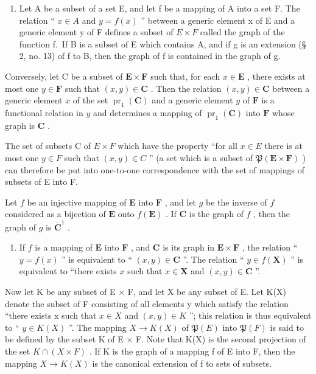 \begin{enumerate}
\def\labelenumi{\arabic{enumi}.}
\setcounter{enumi}{4}
\tightlist
\item
  Let A be a subset of a set E, and let f be a mapping of A into a set F. The relation `` \(x \in A\) and \(y = f(x)\) '' between a generic element x of E and a generic element y of F defines a subset of \(E \times F\) called the graph of the function f.~If B is a subset of E which contains A, and if g is an extension (§ 2, no. 13) of f to B, then the graph of f is contained in the graph of g.
\end{enumerate}

Conversely, let C be a subset of \(\mathbf{E} \times \mathbf{F}\) such that, for each \(x \in \mathbf{E}\) , there exists at most one \(y \in \mathbf{F}\) such that \((x, y) \in \mathbf{C}\) . Then the relation \((x, y) \in \mathbf{C}\) between a generic element \(x\) of the set \(\operatorname{pr}_1(\mathbf{C})\) and a generic element \(y\) of \(\mathbf{F}\) is a functional relation in \(y\) and determines a mapping of \(\operatorname{pr}_1(\mathbf{C})\) into \(\mathbf{F}\) whose graph is \(\mathbf{C}\) .

The set of subsets C of \(E \times F\) which have the property ``for all \(x \in E\) there is at most one \(y \in F\) such that \((x, y) \in C\) '' (a set which is a subset of \(\mathfrak{P}(\mathbf{E} \times \mathbf{F})\) ) can therefore be put into one-to-one correspondence with the set of mappings of subsets of E into F.

Let \(f\) be an injective mapping of \(\mathbf{E}\) into \(\mathbf{F}\) , and let \(g\) be the inverse of \(f\) considered as a bijection of \(\mathbf{E}\) onto \(f(\mathbf{E})\) . If \(\mathbf{C}\) is the graph of \(f\) , then the graph of \(g\) is \(\overline{\mathbf{C}}^1\) .

\begin{enumerate}
\def\labelenumi{\arabic{enumi}.}
\setcounter{enumi}{5}
\tightlist
\item
  If \(f\) is a mapping of \(\mathbf{E}\) into \(\mathbf{F}\) , and \(\mathbf{C}\) is its graph in \(\mathbf{E} \times \mathbf{F}\) , the relation `` \(y = f(x)\) '' is equivalent to `` \((x, y) \in \mathbf{C}\) ''. The relation `` \(y \in f(\mathbf{X})\) '' is equivalent to ``there exists \(x\) such that \(x \in \mathbf{X}\) and \((x, y) \in \mathbf{C}\) ''.
\end{enumerate}

Now let K be any subset of E × F, and let X be any subset of E. Let K(X) denote the subset of F consisting of all elements y which satisfy the relation ``there exists x such that \(x \in X\) and \((x, y) \in K\) ''; this relation is thus equivalent to `` \(y \in K(X)\) ''. The mapping \(X \to K(X)\) of \(\mathfrak{P}(E)\) into \(\mathfrak{P}(F)\) is said to be defined by the subset K of E × F. Note that K(X) is the second projection of the set \(K \cap (X \times F)\) . If K is the graph of a mapping f of E into F, then the mapping \(X \to K(X)\) is the canonical extension of f to sets of subsets.

